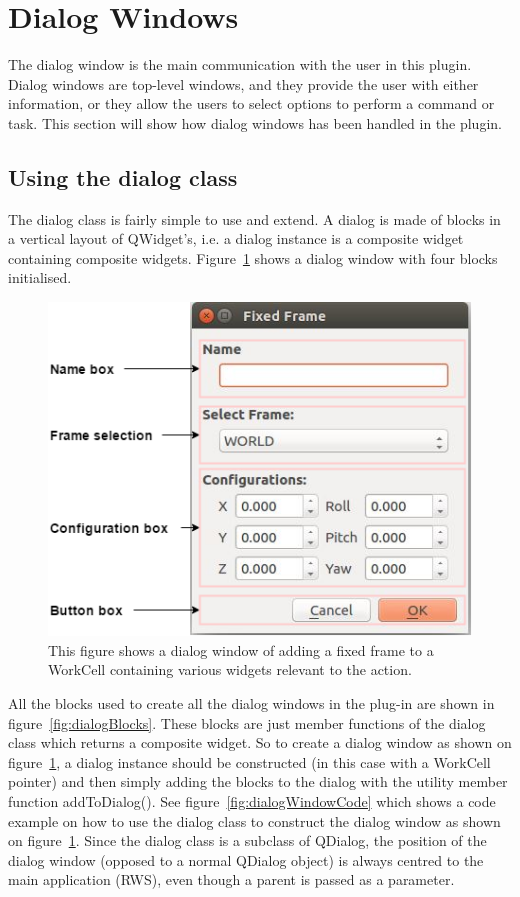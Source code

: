 \section{Dialog Windows}
\label{sec:DialogWindows}
The dialog window is the main communication with the user in this plugin. Dialog windows are top-level windows, and they provide the user with either information, or they allow the users to select options to perform a command or task. This section will show how dialog windows has been handled in the plugin.\\

\subsection{Using the dialog class}
The dialog class is fairly simple to use and extend. A dialog is made of blocks in a vertical layout of QWidget's, i.e. a dialog instance is a composite widget containing composite widgets. Figure~\ref{fig:dialogWindowExample} shows a dialog window with four blocks initialised.

\begin{figure}[h]
	\centering
	\includegraphics[scale=0.55]{Figures/dialogclassblocks.png}
	\caption{This figure shows a dialog window of adding a fixed frame to a WorkCell containing various widgets relevant to the action. }
	\label{fig:dialogWindowExample}
\end{figure}

All the blocks used to create all the dialog windows in the plug-in are shown in figure~\ref{fig:dialogBlocks}. These blocks are just member functions of the dialog class which returns a composite widget. So to create a dialog window as shown on figure~\ref{fig:dialogWindowExample}, a dialog instance should be constructed (in this case with a WorkCell pointer) and then simply adding the blocks to the dialog with the utility member function addToDialog(). See figure~\ref{fig:dialogWindowCode} which shows a code example on how to use the dialog class to construct the dialog window as shown on figure~\ref{fig:dialogWindowExample}. Since the dialog class is a subclass of QDialog, the position of the dialog window (opposed to a normal QDialog object) is always centred to the main application (RWS), even though a parent is passed as a parameter.

